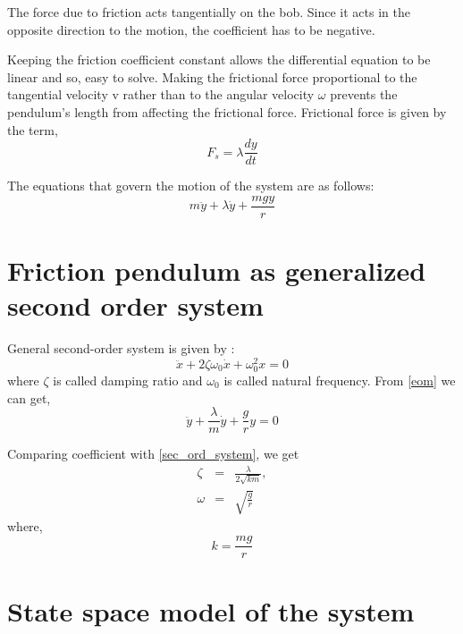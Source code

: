 \documentclass[11pt]{article}
\begin{document}
The force due to friction acts tangentially on the bob. Since it acts in the opposite direction to the motion, the coefficient has to be negative.

Keeping the friction coefficient constant allows the differential equation to be linear and so, easy to solve. Making the frictional force proportional to the tangential velocity v rather than to the angular velocity $\omega$ prevents the pendulum’s length from affecting the frictional force.
\hfil \break
Frictional force is given by the term,
\begin{equation} \label{eq:1}
F_s = \lambda \frac{dy}{dt}
\end{equation}

The equations that govern the motion of the system are as follows:
\begin{equation}
\label{eom}
m\ddot{y} + \lambda\dot{y} + \frac{mgy}{r}
\end{equation}

\section{Friction pendulum as generalized second order system}

General second-order system is given by :
\begin{equation}
\ddot{x} + 2\zeta\omega_0\dot{x} + \omega_0^2x = 0
\label{sec_ord_system}
\end{equation}
where $\zeta$ is called damping ratio and $\omega_0$ is called natural frequency.
\hfill \break
From \ref{eom} we can get,
\begin{equation}
\ddot{y} + \frac{\lambda}{m}\dot{y} + \frac{g}{r}y = 0
\label{pendulum}
\end{equation}

Comparing coefficient with \ref{sec_ord_system}, we get
\begin{eqnarray}
\zeta &=& \frac{\lambda}{2\sqrt{km}}, \\
\label{def_zeta}
\omega &=& \sqrt{\frac{g}{r}}
\label{def_omega}
\end{eqnarray}
\hfill \break
where,
\begin{equation}
k = \frac{mg}{r}
\label{def_k}
\end{equation}

\newpage
\section{State space model of the system\cite{google}}
\end{document}
